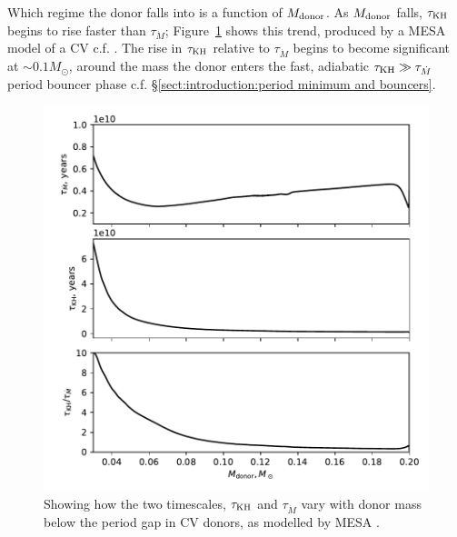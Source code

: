 Which regime the donor falls into is a function of $M_{\rm donor}$. As $M_{\rm donor}$ falls, $\tau_{\rm KH}$ begins to rise faster than $\tau_{\dot M}$; Figure~\ref{fig:modelling:how does tauKH and tauMdot vary with donor mass} shows this trend, produced by a MESA model of a CV c.f. \citep{Paxton_2015,Pala2017a}.
The rise in $\tau_{\rm KH}$ relative to $\tau_{\dot M}$ begins to become significant at $\sim 0.1 M_\odot$, around the mass the donor enters the fast, adiabatic $\tau_{\rm KH} \gg \tau_{\dot M}$ period bouncer phase c.f. \S\ref{sect:introduction:period minimum and bouncers}.
\begin{figure}
    \centering
    \includegraphics[width=\textwidth]{figures/modelling/tau_both_vs_donor_mass_AML000.pdf}
    \caption{Showing how the two timescales, $\tau_{\rm KH}$ and $\tau_{\dot M}$ vary with donor mass below the period gap in CV donors, as modelled by MESA \citep{Paxton_2015,Pala2017a}.}
    \label{fig:modelling:how does tauKH and tauMdot vary with donor mass}
\end{figure}

